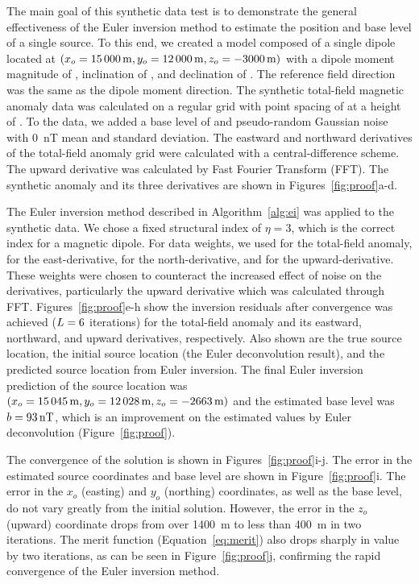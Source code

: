 The main goal of this synthetic data test is to demonstrate the general effectiveness of the Euler inversion method to estimate the position and base level of a single source.
To this end, we created a model composed of a single dipole located at
$(x_o = \SynProofTrueEast, y_o = \SynProofTrueNorth, z_o = \SynProofTrueUp)$
with a dipole moment magnitude of \SynProofInt{}, inclination of \SynProofInc{}, and declination of \SynProofDec{}.
The reference field direction was the same as the dipole moment direction.
The synthetic total-field magnetic anomaly data was calculated on a regular grid
with point spacing of \SynProofSpacing{} at a height of \SynProofHeight{}.
To the data, we added a base level of \SynProofTrueBase{} and
pseudo-random Gaussian noise with \qty{0}{\nano\tesla} mean and \SynProofNoise{} standard deviation.
The eastward and northward derivatives of the total-field anomaly grid were calculated with a central-difference scheme.
The upward derivative was calculated by Fast Fourier Transform (FFT).
The synthetic anomaly and its three derivatives are shown in Figures~\ref{fig:proof}a-d.

The Euler inversion method described in Algorithm~\ref{alg:ei} was applied to the synthetic data.
We chose a fixed structural index of $\eta=3$, which is the correct index for a magnetic dipole.
For data weights, we used \DefaultWeightsF{} for the total-field anomaly, \DefaultWeightsE{} for the east-derivative, \DefaultWeightsN{} for the north-derivative, and \DefaultWeightsU{} for the upward-derivative.
These weights were chosen to counteract the increased effect of noise on the derivatives, particularly the upward derivative which was calculated through FFT.
Figures~\ref{fig:proof}e-h show the inversion residuals after convergence was achieved ($L=6{}$ iterations) for the total-field anomaly and its eastward, northward, and upward derivatives, respectively.
Also shown are the true source location, the initial source location (the Euler deconvolution result), and the predicted source location from Euler inversion.
The final Euler inversion prediction of the source location was $(x_o=\SynProofEstEast, y_o=\SynProofEstNorth, z_o=\SynProofEstUp)$ and the estimated base level was $b = \qty{93}{\nano\tesla}$, which is an improvement on the estimated values by Euler deconvolution (Figure~\ref{fig:proof}).

The convergence of the solution is shown in Figures~\ref{fig:proof}i-j.
The error in the estimated source coordinates and base level are shown in Figure~\ref{fig:proof}i.
The error in the $x_o$ (easting) and $y_o$ (northing) coordinates, as well as the base level, do not vary greatly from the initial solution.
However, the error in the $z_o$ (upward) coordinate drops from over \qty{1400}{\m} to less than \qty{400}{\m} in two iterations.
The merit function (Equation~\ref{eq:merit}) also drops sharply in value by two iterations, as can be seen in Figure~\ref{fig:proof}j, confirming the rapid convergence of the Euler inversion method.


